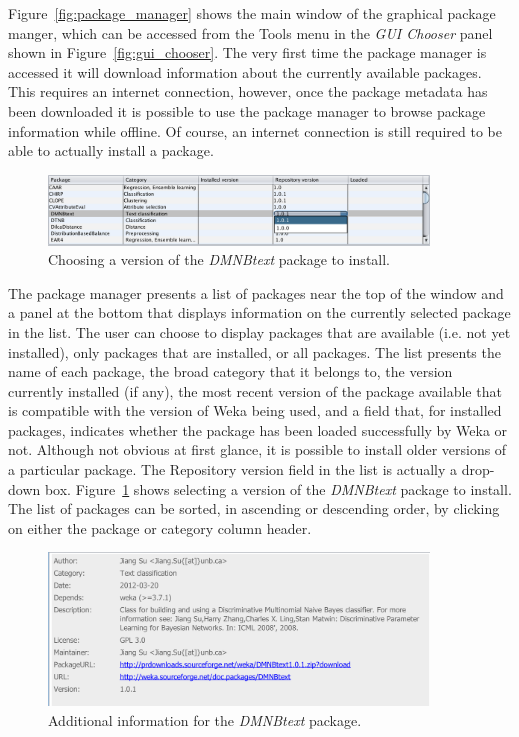 Figure~\ref{fig:package_manager} shows the main window of the
graphical package manger, which can be accessed from the Tools menu in
the \textit{GUI Chooser} panel shown in
Figure~\ref{fig:gui_chooser}. The very first time the package manager
is accessed it will download information about the currently available
packages. This requires an internet connection, however, once the
package metadata has been downloaded it is possible to use the package
manager to browse package information while offline. Of course, an
internet connection is still required to be able to actually install a
package.

\begin{figure}[!th]
\centering
\includegraphics[width=0.9\textwidth]{images/P2.png}
\caption{Choosing a version of the \textit{DMNBtext} package to install.}
\label{fig:package_manager_2}
\end{figure}

The package manager presents a list of packages near the top of the
window and a panel at the bottom that displays information on the
currently selected package in the list. The user can choose to display
packages that are available (i.e. not yet installed), only packages
that are installed, or all packages. The list presents the name of
each package, the broad category that it belongs to, the version
currently installed (if any), the most recent version of the package
available that is compatible with the version of Weka being used, and
a field that, for installed packages, indicates whether the package
has been loaded successfully by Weka or not. Although not obvious at
first glance, it is possible to install older versions of a particular
package. The Repository version field in the list is actually a
drop-down box. Figure~\ref{fig:package_manager_2} shows selecting a
version of the \textit{DMNBtext} package to install. The list of
packages can be sorted, in ascending or descending order, by clicking
on either the package or category column header.

\begin{figure}[!th]
\centering
\includegraphics[width=0.9\textwidth]{images/P3.png}
\caption{Additional information for the \textit{DMNBtext} package.}
\label{fig:package_manager_3}
\end{figure}

